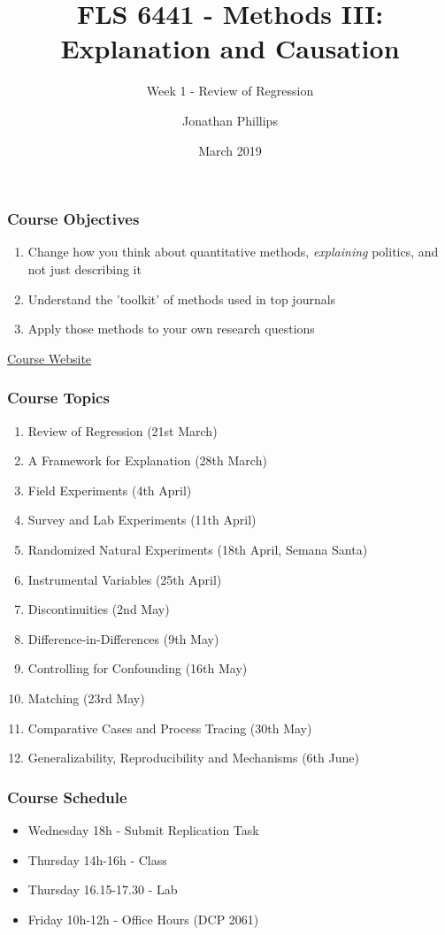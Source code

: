 \documentclass[xcolor=x11names,compress]{beamer}\usepackage[]{graphicx}\usepackage[]{color}
\title{FLS 6441 - Methods III: Explanation and Causation}
\subtitle{Week 1 - Review of Regression}
\author{Jonathan Phillips}
\date{March 2019}
\renewcommand{\(}{\begin{columns}}
\renewcommand{\)}{\end{columns}}
\newcommand{\<}[1]{\begin{column}{#1}}
\renewcommand{\>}{\end{column}}
\begin{document}
\frame{\titlepage}

\begin{frame}
\frametitle{Course Objectives}
\begin{enumerate}
\item Change how you think about quantitative methods, \textit{explaining} politics, and not just describing it
\pause
\item Understand the 'toolkit' of methods used in top journals
\pause
\item Apply those methods to your own research questions
\pause
\end{enumerate}
\begin{center}
\href{https://jonnyphillips.github.io/Methods_III}{Course Website}
\end{center}
\end{frame}

\begin{frame}
\frametitle{Course Topics}
\begin{enumerate}
\item Review of Regression (21st March)
\pause
\item A Framework for Explanation (28th March)
\pause
\item Field Experiments (4th April)
\item Survey and Lab Experiments (11th April)
\item Randomized Natural Experiments (18th April, Semana Santa)
\pause
\item Instrumental Variables (25th April)
\item Discontinuities (2nd May)
\pause
\item Difference-in-Differences (9th May)
\item Controlling for Confounding (16th May)
\item Matching (23rd May)
\item Comparative Cases and Process Tracing (30th May)
\pause
\item Generalizability, Reproducibility and Mechanisms (6th June)
\end{enumerate}
\end{frame}

\begin{frame}
\frametitle{Course Schedule}
\begin{itemize}
\item Wednesday 18h - Submit Replication Task
\pause
\item Thursday 14h-16h - Class
\pause
\item Thursday 16.15-17.30 - Lab
\pause
\item Friday 10h-12h - Office Hours (DCP 2061)
\end{itemize}
\end{frame}
\end{document}
